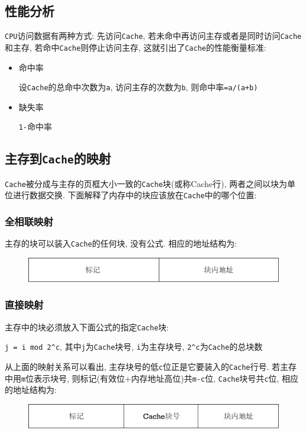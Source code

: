 \subsection{性能分析}
\verb|CPU|访问数据有两种方式: 先访问\verb|Cache|, 若未命中再访问主存或者是同时访问\verb|Cache|和主存, 若命中\verb|Cache|则停止访问主存, 这就引出了\verb|Cache|的性能衡量标准:
\begin{itemize}
\item 命中率 \par 设\verb|Cache|的总命中次数为\verb|a|, 访问主存的次数为\verb|b|, 则命中率\verb|=a/(a+b)|
\item 缺失率 \par \verb|1-|命中率
\end{itemize}
\subsection{主存到\texttt{Cache}的映射}
\verb|Cache|被分成与主存的页框大小一致的\verb|Cache|块(或称Cache行), 两者之间以块为单位进行数据交换. 下面解释了内存中的块应该放在\verb|Cache|中的哪个位置:
\subsubsection{全相联映射}
主存的块可以装入\verb|Cache|的任何块, 没有公式. 相应的地址结构为:
\begin{figure}[H]
\centering
\includegraphics[scale=.5]{img/figure13.pdf}
\end{figure}
\subsubsection{直接映射}
主存中的块必须放入下面公式的指定\verb|Cache|块:
\begin{center}
\verb|j = i mod 2^c|, 其中\verb|j|为\verb|Cache|块号, \verb|i|为主存块号, \verb|2^c|为\verb|Cache|的总块数
\end{center} \par
\par 从上面的映射关系可以看出, 主存块号的低\verb|c|位正是它要装入的\verb|Cache|行号. 若主存中用\verb|m|位表示块号, 则标记(有效位+内存地址高位)共\verb|m-c|位, \verb|Cache|块号共\verb|c|位, 相应的地址结构为:
\begin{figure}[H]
\centering
\includegraphics[scale=.5]{img/figure15.pdf}
\end{figure}\par
